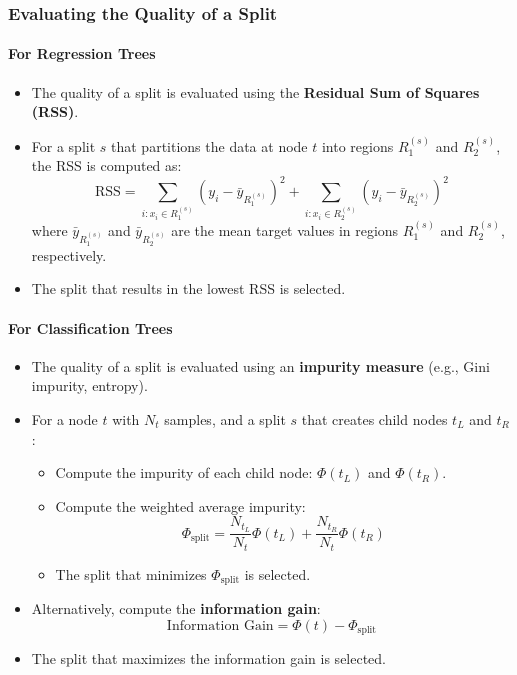 \documentclass{article}
\begin{document}
\subsubsection{Evaluating the Quality of a Split}

\paragraph{For Regression Trees}

\begin{itemize}
    \item The quality of a split is evaluated using the \textbf{Residual Sum of Squares (RSS)}.
    \item For a split $s$ that partitions the data at node $t$ into regions $R_1^{(s)}$ and $R_2^{(s)}$, the RSS is computed as:
    \[
    \mathrm{RSS} = \sum_{i: x_i \in R_1^{(s)}} (y_i - \bar{y}_{R_1^{(s)}})^2 + \sum_{i: x_i \in R_2^{(s)}} (y_i - \bar{y}_{R_2^{(s)}})^2
    \]
    where $\bar{y}_{R_1^{(s)}}$ and $\bar{y}_{R_2^{(s)}}$ are the mean target values in regions $R_1^{(s)}$ and $R_2^{(s)}$, respectively.
    \item The split that results in the lowest RSS is selected.
\end{itemize}

\paragraph{For Classification Trees}

\begin{itemize}
    \item The quality of a split is evaluated using an \textbf{impurity measure} (e.g., Gini impurity, entropy).
    \item For a node $t$ with $N_t$ samples, and a split $s$ that creates child nodes $t_L$ and $t_R$:
    \begin{itemize}
        \item Compute the impurity of each child node: $\Phi(t_L)$ and $\Phi(t_R)$.
        \item Compute the weighted average impurity:
        \[
        \Phi_{\text{split}} = \frac{N_{t_L}}{N_t} \Phi(t_L) + \frac{N_{t_R}}{N_t} \Phi(t_R)
        \]
    \item The split that minimizes $\Phi_{\text{split}}$ is selected.
    \end{itemize}
    \item Alternatively, compute the \textbf{information gain}:
    \[
    \text{Information Gain} = \Phi(t) - \Phi_{\text{split}}
    \]
    \item The split that maximizes the information gain is selected.
\end{itemize}
\end{document}
